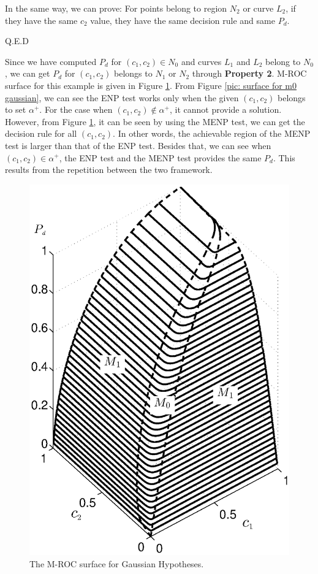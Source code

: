 In the same way, we can prove: For points belong to region $N_2$ or curve $L_2$, if they have the same $c_2$ value, they have the same decision rule and same $P_d$.

Q.E.D

Since we have computed $P_d$ for $(c_1, c_2) \in N_0$ and curves $L_1$ and $L_2$ belong to $N_0$, we can get $P_d$ for $(c_1, c_2)$ belongs to $N_1$ or $N_2$ through \textbf{Property 2}. M-ROC surface for this example is given in Figure  \ref{pic: LJS}. 
From Figure \ref{pic: surface for m0 gaussian}, we can see the ENP test works only when the given $(c_1, c_2)$ belongs to set $\alpha^+$. For the case when $(c_1, c_2) \notin \alpha^+$, it cannot provide a solution.  However,  from Figure \ref{pic: LJS}, it can be seen by using the MENP test, we can get the decision rule for all $(c_1, c_2)$. 
In other words, the achievable region of the MENP test is larger than that of the ENP test. 
Besides that, we can see when $(c_1, c_2) \in \alpha^+$, the ENP test and the MENP test provides the same $P_d$. This results from the repetition between the two framework.  
\begin{figure}[!t]
\centering
\includegraphics[width=12cm, height=16cm]{3/ROC2.eps}
\caption{The M-ROC surface for Gaussian Hypotheses.}
\label{pic: LJS}
\end{figure}

